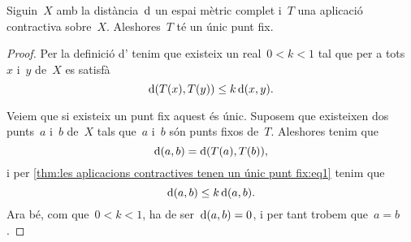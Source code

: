 \documentclass[../../main.tex]{subfiles}
\begin{document}
    \begin{theorem}
        \label{thm:les aplicacions contractives tenen un únic punt fix}
        Siguin~\(X\) amb la distància~\(\operatorname{d}\) un espai mètric complet i~\(T\) una aplicació contractiva sobre~\(X\).
        Aleshores~\(T\) té un únic punt fix.
        \begin{proof}
            Per la definició d' tenim que existeix un real~\(0<k<1\) tal que per a tots~\(x\) i~\(y\) de~\(X\) es satisfà
            \begin{equation}
                \label{thm:les aplicacions contractives tenen un únic punt fix:eq1}
                \operatorname{d}(T(x),T(y))\leq k\operatorname{d}(x,y).
            \end{equation}

            Veiem que si existeix un punt fix aquest és únic.
            Suposem que existeixen dos punts~\(a\) i~\(b\) de~\(X\) tals que~\(a\) i~\(b\) són punts fixos de~\(T\).
            Aleshores tenim que
            \[
                \operatorname{d}(a,b)=\operatorname{d}(T(a),T(b)),
            \]
            i per \eqref{thm:les aplicacions contractives tenen un únic punt fix:eq1} tenim que
            \[
                \operatorname{d}(a,b)\leq k\operatorname{d}(a,b).
            \]
            Ara bé, com que~\(0<k<1\), ha de ser~\(\operatorname{d}(a,b)=0\), i per tant trobem que~\(a=b\).


\end{proof}
\end{theorem}
\end{document}

